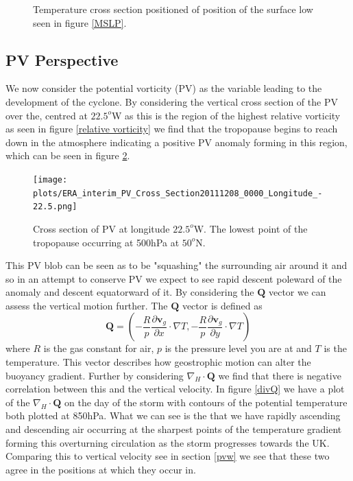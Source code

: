 \documentclass[12pt,a4paper]{article}
\begin{document}
\begin{figure}[H]
    \centering
        \centering
        \caption{Temperature cross section positioned of position of the surface low seen in figure \ref{MSLP}.}
        \label{tempcross}
\end{figure}
\subsection{PV Perspective}
We now consider the potential vorticity (PV) as the variable leading to the development of the cyclone. By considering the vertical cross section of the PV over the, centred at $22.5^o$W as this is the region of the highest relative vorticity as seen in figure \ref{relative vorticity} we find that the tropopause begins to reach down in the atmosphere indicating a positive PV anomaly forming in this region, which can be seen in figure \ref{PV cross section}. 
\begin{figure}
    \texttt{[image: plots/ERA\_interim\_PV\_Cross\_Section20111208\_0000\_Longitude\_-22.5.png]}
    \label{PV cross section}
    \caption{Cross section of PV at longitude $22.5^o$W. The lowest point of the tropopause occurring at 500hPa at $50^o$N. }
\end{figure}
This PV blob can be seen as to be "squashing" the surrounding air around it and so in an attempt to conserve PV we expect to see rapid descent poleward of the anomaly and descent equatorward of it. By considering the $\bm{Q}$ vector we can assess the vertical motion further. The $\bm{Q}$ vector is defined as 
\begin{equation} 
\bm{Q} = \left(-\frac{R}{p}\frac{\partial \bm{v}_g}{\partial x}\cdot\nabla T, - \frac{R}{p}\frac{\partial \bm{v}_g}{\partial y}\cdot\nabla T\right)
\end{equation}
where $R$ is the gas constant for air, $p$ is the pressure level you are at and $T$ is the temperature. This vector describes how geostrophic motion can alter the buoyancy gradient. Further by considering $\nabla_H\cdot\bm{Q}$ we find that there is negative correlation between this and the vertical velocity. 
In figure \ref{divQ} we have a plot of the $\nabla_H\cdot\bm{Q}$ on the day of the storm with contours of the potential temperature both plotted at 850hPa. What we can see is the that we have rapidly ascending and descending air occurring at the sharpest points of the temperature gradient forming this overturning circulation as the storm progresses towards the UK. Comparing this to vertical velocity see in section \ref{pvw} we see that these two agree in the positions at which they occur in.
\end{document}
